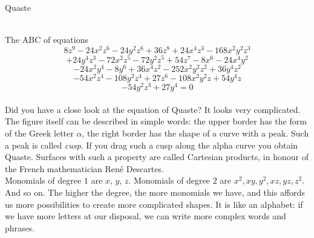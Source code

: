 \documentclass[en]{./../../common/SurferDesc}%
\begin{document}
\footnotesize





\begin{surferPage}
  \begin{surferTitle}Quaste\end{surferTitle} \\
The ABC of equations
  \smallskip
\[8z^9-24x^2z^6-24y^2z^6+36z^8+24x^4z^3-168x^2y^2z^3\]
\[+24y^4z^3-72x^2z^5-72y^2z^5+54z^7-8x^6-24x^4y^2\]
\[-24x^2y^4-8y^6 + 36x^4z^2-252x^2y^2z^2+36y^4z^2\]
\[- 54x^2z^4-108y^2z^4 + 27z^6-108x^2y^2z + 54y^4z\]
\[-54y^2z^3 + 27y^4 = 0\]\\
\vspace{0.3cm}
Did you have a close look at the equation of Quaste? It  looks very complicated.
The figure itself can be described in simple words: the upper border has the form of the Greek letter $\alpha$, the right border has the shape of a curve with a peak. Such a peak is called {\it cusp}. If you drag such a cusp along the alpha curve you obtain Quaste. Surfaces with such a property are called Cartesian products, in honour of the French mathematician  Ren\'e Descartes.\\
\vspace{0.3cm}
Monomials of degree $1$ are $x$, $y$, $z$. Monomials of degree $2$ are $x^2, xy, y^2, xz, yz, z^2$. And so on. The higher the degree, the more monomials we have, and this affords us more possibilities to create more complicated shapes. It is like an alphabet: if we have more letters at our disposal, we can write more complex words and phrases. 




  \begin{surferText}
     \end{surferText}
\end{surferPage}
\end{document}
